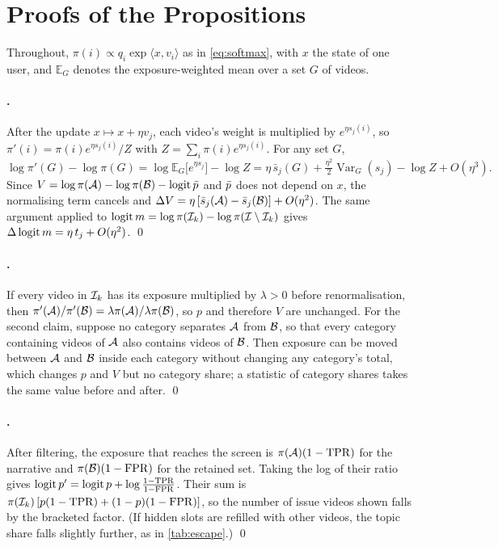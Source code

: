 \section{Proofs of the Propositions}
\label{app:proofs}

Throughout, $\pi(i)\propto q_i\exp\langle x,v_i\rangle$ as in \cref{eq:softmax}, with $x$ the state of one user, and $\mathbb{E}_G$ denotes the exposure-weighted mean over a set $G$ of videos.

\paragraph{.} After the update $x\mapsto x+\eta v_j$, each video's weight is multiplied by $e^{\eta s_j(i)}$, so $\pi'(i)=\pi(i)e^{\eta s_j(i)}/Z$ with $Z=\sum_i\pi(i)e^{\eta s_j(i)}$. For any set $G$,
\[
  \log\pi'(G)-\log\pi(G)=\log\mathbb{E}_G\bigl[e^{\eta s_j}\bigr]-\log Z=\eta\,\bar s_j(G)+\tfrac{\eta^2}{2}\operatorname{Var}_G(s_j)-\log Z+O(\eta^3).
\]
Since $V=\log\pi(\mathcal{A})-\log\pi(\mathcal{B})-\operatorname{logit}\bar p$ and $\bar p$ does not depend on $x$, the normalising term cancels and $\Delta V=\eta\,[\bar s_j(\mathcal{A})-\bar s_j(\mathcal{B})]+O(\eta^2)$. The same argument applied to $\operatorname{logit} m=\log\pi(\mathcal{I}_k)-\log\pi(\mathcal{I}\setminus\mathcal{I}_k)$ gives $\Delta\operatorname{logit} m=\eta\,t_j+O(\eta^2)$. \qed

\paragraph{.} If every video in $\mathcal{I}_k$ has its exposure multiplied by $\lambda>0$ before renormalisation, then $\pi'(\mathcal{A})/\pi'(\mathcal{B})=\lambda\pi(\mathcal{A})/\lambda\pi(\mathcal{B})$, so $p$ and therefore $V$ are unchanged. For the second claim, suppose no category separates $\mathcal{A}$ from $\mathcal{B}$, so that every category containing videos of $\mathcal{A}$ also contains videos of $\mathcal{B}$. Then exposure can be moved between $\mathcal{A}$ and $\mathcal{B}$ inside each category without changing any category's total, which changes $p$ and $V$ but no category share; a statistic of category shares takes the same value before and after. \qed

\paragraph{.} After filtering, the exposure that reaches the screen is $\pi(\mathcal{A})(1-\mathrm{TPR})$ for the narrative and $\pi(\mathcal{B})(1-\mathrm{FPR})$ for the retained set. Taking the log of their ratio gives $\operatorname{logit} p'=\operatorname{logit} p+\log\frac{1-\mathrm{TPR}}{1-\mathrm{FPR}}$. Their sum is $\pi(\mathcal{I}_k)\,[p(1-\mathrm{TPR})+(1-p)(1-\mathrm{FPR})]$, so the number of issue videos shown falls by the bracketed factor. (If hidden slots are refilled with other videos, the topic share falls slightly further, as in \cref{tab:escape}.) \qed

